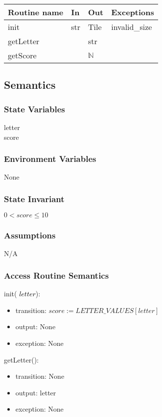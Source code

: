 \documentclass[12pt]{article}
\begin{document}
\begin{tabular}{| l | l | l | l |}
\hline
\textbf{Routine name} & \textbf{In} & \textbf{Out} & \textbf{Exceptions}\\
\hline
init & str & Tile & invalid\_size \\
\hline
getLetter &  & str & \\
\hline
getScore & & $\mathbb{N}$ & \\
\hline
\end{tabular}

\subsection* {Semantics}

\subsubsection* {State Variables}
letter \\
score \\
\subsubsection* {Environment Variables}
None
\subsubsection* {State Invariant}
$0 < score \leq 10$
\subsubsection* {Assumptions}

N/A

\begin{itemize}

\end{itemize}

\subsubsection* {Access Routine Semantics}

\noindent init(\textcolor{black}{ $letter$}):
\begin{itemize}
\item transition: $score := LETTER\_VALUES[letter]$ 
\item output: None
\item exception: None
\end{itemize}

\noindent getLetter():
\begin{itemize}
\item transition: None
\item output: letter
\item exception: None
\end{itemize}
\end{document}

